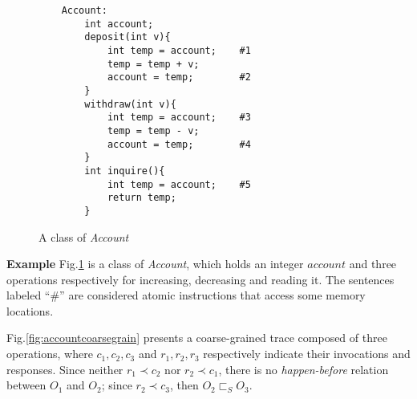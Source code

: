 \begin{figure}
\centering
    \begin{small}

        \begin{verbatim}
    Account:
        int account;
        deposit(int v){
            int temp = account;    #1
            temp = temp + v;
            account = temp;        #2
        }
        withdraw(int v){
            int temp = account;    #3
            temp = temp - v;
            account = temp;        #4
        }
        int inquire(){
            int temp = account;    #5
            return temp;
        }
        \end{verbatim}
        \end{small}
        \caption{A class of \textit{Account}}
        \label{fig:codeaccount}
\end{figure}

\noindent \textbf{Example}
Fig.\ref{fig:codeaccount} is a class of \textit{Account}, which holds an integer $account$ and three operations respectively for increasing, decreasing and reading it. The sentences labeled ``\#'' are considered atomic instructions that access some memory locations.

Fig.\ref{fig:accountcoarsegrain} presents a coarse-grained trace composed of three operations, where $c_1,c_2,c_3$ and $r_1,r_2,r_3$ respectively indicate their invocations and responses. Since neither $r_1\prec c_2$ nor $r_2\prec c_1$, there is no \textit{happen-before} relation between $O_1$ and $O_2$; since $r_2\prec c_3$, then $O_2\sqsubset_S O_3$. \\


